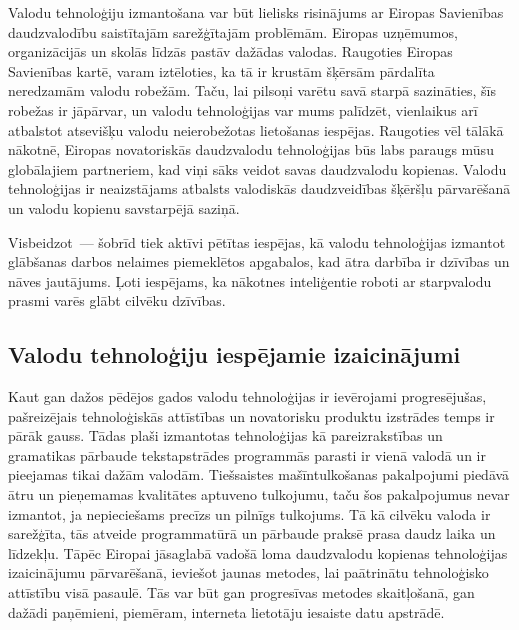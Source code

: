 \begin{multicols}{2}

Valodu tehnoloģiju izmantošana var būt lielisks risinājums ar Eiropas Savienības daudzvalodību saistītajām sarežģītajām problēmām.
Eiropas uzņēmumos, organizācijās un skolās līdzās pastāv dažādas valodas. 
Raugoties Eiropas Savienības kartē, varam iztēloties, ka tā ir krustām šķērsām pārdalīta neredzamām valodu robežām. 
Taču, lai pilsoņi varētu savā starpā sazināties, šīs robežas ir jāpārvar, un valodu tehnoloģijas var mums palīdzēt, vienlaikus arī atbalstot atsevišķu valodu neierobežotas lietošanas iespējas. 
Raugoties vēl tālākā \mbox{nākotnē}, Eiropas novatoriskās daudzvalodu tehnoloģijas būs labs paraugs mūsu globālajiem partneriem, kad viņi sāks veidot savas daudzvalodu kopienas. 
Valodu tehnoloģijas ir neaizstājams atbalsts valodiskās daudzveidības šķēršļu pārvarēšanā un valodu kopienu savstarpējā saziņā.

Visbeidzot~--- šobrīd tiek aktīvi pētītas iespējas, kā valodu tehnoloģijas izmantot glābšanas darbos nelaimes piemeklētos apgabalos, kad ātra darbība ir dzīvības un nāves jautājums. 
Ļoti iespējams, ka nākotnes inteliģentie roboti ar starpvalodu prasmi varēs glābt cilvēku dzīvības.

\subsection{Valodu tehnoloģiju iespējamie izaicinājumi}

Kaut gan dažos pēdējos gados valodu tehnoloģijas ir ievērojami progresējušas, pašreizējais tehnoloģiskās attīstības un novatorisku produktu izstrādes temps ir pārāk gauss. 
Tādas plaši izmantotas tehnoloģijas kā pareizrakstības un gramatikas pārbaude tekstapstrādes programmās parasti ir vienā valodā un ir pieejamas tikai dažām valodām.
Tiešsaistes mašīntulkošanas pakalpojumi piedāvā ātru un pieņemamas kvalitātes aptuveno tulkojumu, taču šos pakalpojumus nevar izmantot, ja nepieciešams precīzs un pilnīgs tulkojums. 
Tā kā cilvēku valoda ir sarežģīta, tās atveide programmatūrā un pārbaude praksē prasa daudz laika un līdzekļu. 
Tāpēc Eiropai jāsaglabā vadošā loma daudzvalodu kopienas tehnoloģijas izaicinājumu pārvarēšanā, ieviešot jaunas metodes, lai paātrinātu tehnoloģisko attīstību visā pasaulē. 
Tās var būt gan progresīvas metodes skaitļošanā, gan dažādi paņēmieni, piemēram, interneta lietotāju iesaiste datu apstrādē.



\end{multicols}
